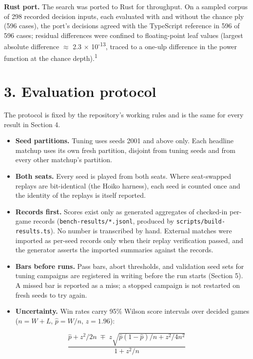 \documentclass[
  11pt,
]{article}
\providecommand{\tightlist}{%
  \setlength{\itemsep}{0pt}\setlength{\parskip}{0pt}}
\begin{document}
\textbf{Rust port.} The search was ported to Rust for throughput. On a
sampled corpus of 298 recorded decision inputs, each evaluated with and
without the chance ply (596 cases), the port's decisions agreed with the
TypeScript reference in 596 of 596 cases; residual differences were
confined to floating-point leaf values (largest absolute difference \(\approx\)
2.3 \(\times\) 10\textsuperscript{-13}, traced to a one-ulp difference in the power function at the
chance depth).\textsuperscript{1}

\section{3. Evaluation protocol}\label{evaluation-protocol}

The protocol is fixed by the repository's working rules and is the same
for every result in Section 4.

\begin{itemize}
\tightlist
\item
  \textbf{Seed partitions.} Tuning uses seeds 2001 and above only. Each
  headline matchup uses its own fresh partition, disjoint from tuning
  seeds and from every other matchup's partition.
\item
  \textbf{Both seats.} Every seed is played from both seats. Where
  seat-swapped replays are bit-identical (the Hoiko harness), each seed
  is counted once and the identity of the replays is itself reported.
\item
  \textbf{Records first.} Scores exist only as generated aggregates of
  checked-in per-game records (\texttt{bench-results/*.jsonl}, produced
  by \texttt{scripts/build-results.ts}). No number is transcribed by
  hand. External matches were imported as per-seed records only when
  their replay verification passed, and the generator asserts the
  imported summaries against the records.
\item
  \textbf{Bars before runs.} Pass bars, abort thresholds, and validation
  seed sets for tuning campaigns are registered in writing before the
  run starts (Section 5). A missed bar is reported as a miss; a stopped
  campaign is not restarted on fresh seeds to try again.
\item
  \textbf{Uncertainty.} Win rates carry 95\% Wilson score intervals over
  decided games (\(n = W + L\), \(\hat p = W / n\), \(z = 1.96\)):
\end{itemize}

\begin{equation}\frac{\hat p + z^2 / 2n \;\mp\; z \sqrt{\hat p (1 - \hat p) / n + z^2 / 4n^2}}{1 + z^2 / n}
\end{equation}
\end{document}

